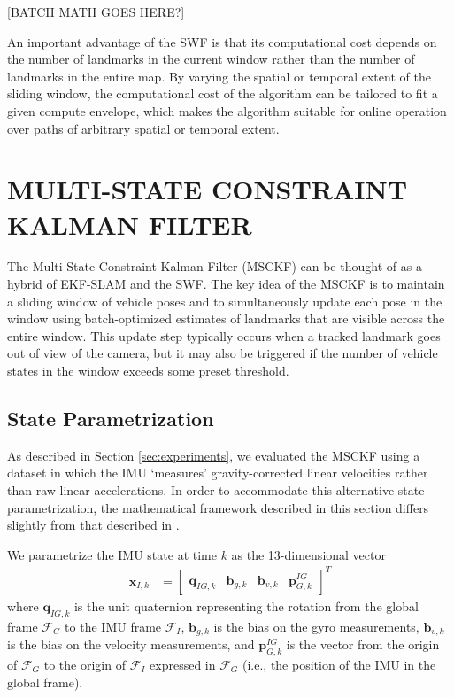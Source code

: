 \documentclass[letterpaper, 10 pt, conference]{ieeeconf}  %
\def\Vec#1{\mathbf{#1}}
\newcommand{\bbm}{\begin{bmatrix}}
\newcommand{\ebm}{\end{bmatrix}}
\begin{document}
[BATCH MATH GOES HERE?]

An important advantage of the SWF is that its computational cost depends on the number of landmarks in the current window rather than the number of landmarks in the entire map.
By varying the spatial or temporal extent of the sliding window, the computational cost of the algorithm can be tailored to fit a given compute envelope, which makes the algorithm suitable for online operation over paths of arbitrary spatial or temporal extent.




\section{MULTI-STATE CONSTRAINT KALMAN FILTER} \label{sec:msckf}
The Multi-State Constraint Kalman Filter (MSCKF) \cite{Mourikis:2007:ICRA} can be thought of as a hybrid of EKF-SLAM and the SWF.
The key idea of the MSCKF is to maintain a sliding window of vehicle poses and to simultaneously update each pose in the window using batch-optimized estimates of landmarks that are visible across the entire window.
This update step typically occurs when a tracked landmark goes out of view of the camera, but it may also be triggered if the number of vehicle states in the window exceeds some preset threshold.

\subsection{State Parametrization}
As described in Section \ref{sec:experiments}, we evaluated the MSCKF using a dataset in which the IMU `measures' gravity-corrected linear velocities rather than raw linear accelerations.
In order to accommodate this alternative state parametrization, the mathematical framework described in this section differs slightly from that described in \cite{Mourikis:2007:ICRA}.

We parametrize the IMU state at time $k$ as the 13-dimensional vector
\begin{align}
    \Vec{x}_{I,k} &= \bbm \Vec{q}_{IG,k} & \Vec{b}_{g,k} & \Vec{b}_{v,k} & \Vec{p}_{G,k}^{IG} \ebm^T
\end{align}
where $\Vec{q}_{IG,k}$ is the unit quaternion representing the rotation from the global frame $\mathcal{F}_G$ to the IMU frame $\mathcal{F}_I$, $\Vec{b}_{g,k}$ is the bias on the gyro measurements, $\Vec{b}_{v,k}$ is the bias on the velocity measurements, and $\Vec{p}_{G,k}^{IG}$ is the vector from the origin of $\mathcal{F}_G$ to the origin of $\mathcal{F}_I$ expressed in $\mathcal{F}_G$ (i.e., the position of the IMU in the global frame).
\end{document}
